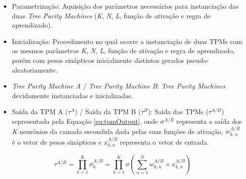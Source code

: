 \documentclass[a4paper,10pt,oneside,conference,final,keeplastbox]{inatel}
\begin{document}
        
    
        \begin{itemize}
            \item Parametrização:
            Aquisição dos parâmetros necessários para instanciação das duas \textit{Tree Parity Machines} (\textit{K}, \textit{N}, \textit{L}, função de ativação e regra de aprendizado).
                
            \item Inicialização:
            Procedimento no qual ocorre a instanciação de duas TPMs com os mesmos parâmetros \textit{K}, \textit{N}, \textit{L}, função de ativação e regra de aprendizado, porém com pesos sinápticos inicialmente distintos gerados pseudo-aleatoriamente.
                
            \item \textit{Tree Parity Machine A} / \textit{Tree Parity Machine B}:
            \textit{Tree Parity Machines} devidamente instanciadas e inicializadas.
                
            \item Saída da TPM A ($\tau^A$) / Saída da TPM B ($\tau^B$):
            Saída das TPMs ($\tau^{A/B}$) representada pela Equação \eqref{eq:tpmOutput}, onde $\sigma^{A/B}$ representa a saída dos \textit{K} neurônios da camada escondida dada pelas suas funções de ativação, $w^{A/B}_{k,n}$ é o vetor de pesos sinápticos e $x^{A/B}_{k,n}$ representa o vetor de entrada.
            
        \end{itemize}
        
        \begin{equation}
            \label{eq:tpmOutput}
            \tau^{A/B} = \displaystyle\prod_{k=1}^{K} \sigma_{k}^{A/B} = \displaystyle\prod_{k=1}^{K} \sigma \left (\displaystyle\sum_{n=1}^{N} w_{k,n}^{A/B} \times x_{k,n}^{A/B} \right )
        \end{equation}
    
\end{document}
